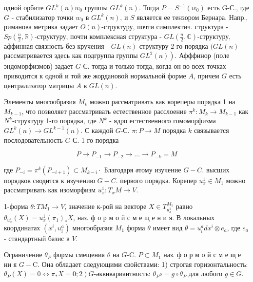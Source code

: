 \documentclass[10pt]{article}
\begin{document}
одной орбите $G L^{k}(n) w_{0}$ групшы $G L^{k}(n)$. Тогда $P=S^{-1}\left(w_{0}\right)$ есть G-С., где $G$ - стабилизатор точки $w_{0}$ в $G L^{k}(n)$, и $S$ является ее тензором Бернара. Напр., риманова метрика задает $O(n)$-структуру, почти симплектич. структура - $S p\left(\frac{n}{2}, \mathbb{R}\right)$-структуру, почти комплексная структура - $G L\left(\frac{n}{2}, \mathbb{C}\right)$-структуру, аффинная связность без кручения - $G L(n)$-структуру 2-го порядка $(G L(n)$ рассматривается здесь как подгруппа группы $\left.G L^{2}(n)\right)$. Афффинор (поле эндоморфизмов) задает $G$-С. тогда и только тогда, когда он во всех точках приводится к одной и той же жордановой нормальной форме $A$, причем $G$ есть централизатор матрицы $A$ в $G L(n)$.



Элементы многообразия $M_{k}$ можно рассматривать как кореперы порядка 1 на $M_{k-1}$, что позволяет рассматривать естественное расслоение $\pi^{k}: M_{k} \rightarrow M_{k-1}$ как $N^{k}$-структуру 1-го порядка, где $N^{k}$ - ядро естественного гомоморфизма $G L^{k}(n) \rightarrow G L^{k-1}(n)$. С каждой $G$-С. $\pi: P \rightarrow M$ порядка $k$ связывается послөдовательность $G$-С. 1-го порядка



\[

P \longrightarrow P_{-1} \longrightarrow P_{-2} \longrightarrow \ldots \longrightarrow P_{-k}=M

\]



где $P_{-i}=\pi^{k}\left(P_{-i+1}\right) \subset M_{k-i} \cdot$ Благодаря әтому изучение $G-C$. высших порядков сводится к изучению $G-C$. первого порядка. Корепер $u_{x}^{1} \in M_{1}$ можно рассматривать как изоморфизм $u_{x}^{1}: T_{x} M \rightarrow V$.



1-форма $\theta: T M_{1} \rightarrow V$, значение к-рой на векторе $X \in T_{u_{x}^{1}}^{M_{1}}$ равно $\theta_{u_{x}^{1}}(X)=u_{x}^{1}\left(\pi_{1}\right)_{*} X$, наз. ф о р м о й с м е щ е н и я. В локальных координатах $\left(x^{i}, u_{i}^{a}\right)$ многообразия $M_{1}$ форма $\theta$ имеет вид $\theta=u_{i}^{a} d x^{i} \otimes e_{a}$, где $e_{a}$ - стандартный базис в $V$.



Ограничение $\theta_{P}$ формы смещения $\theta$ на $G$-C. $P \subset M_{1}$ наз. ф о р м о й с м е щ е ни я $G-\mathrm{C}$. Она обладает следующими свойствами: 1) строгая горизонтальность: $\left.\theta_{P}(X)=0 \Leftrightarrow \pi_{*} X=0 ; 2\right) G$-әквивариантность: $\theta_{P} \circ=g \circ \theta_{P}$ для любого $g \in G$.
\end{document}
